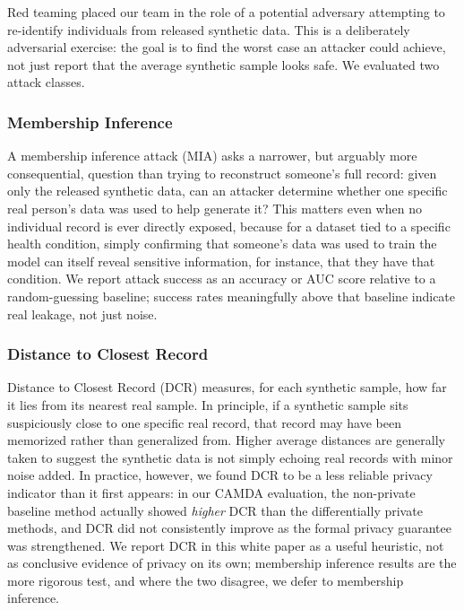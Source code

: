 \documentclass[webpdf,contemporary,large]{oup-authoring-template}%
\theoremstyle{thmstyleone}%
\theoremstyle{thmstyletwo}%
\theoremstyle{thmstylethree}%
\begin{document}
Red teaming placed our team in the role of a potential adversary attempting to re-identify individuals from released synthetic data. This is a deliberately adversarial exercise: the goal is to find the worst case an attacker could achieve, not just report that the average synthetic sample looks safe. We evaluated two attack classes.

\subsubsection{Membership Inference}

A membership inference attack (MIA) asks a narrower, but arguably more consequential, question than trying to reconstruct someone's full record: given only the released synthetic data, can an attacker determine whether one specific real person's data was used to help generate it? This matters even when no individual record is ever directly exposed, because for a dataset tied to a specific health condition, simply confirming that someone's data was used to train the model can itself reveal sensitive information, for instance, that they have that condition. We report attack success as an accuracy or AUC score relative to a random-guessing baseline; success rates meaningfully above that baseline indicate real leakage, not just noise.

\subsubsection{Distance to Closest Record}

Distance to Closest Record (DCR) measures, for each synthetic sample, how far it lies from its nearest real sample. In principle, if a synthetic sample sits suspiciously close to one specific real record, that record may have been memorized rather than generalized from. Higher average distances are generally taken to suggest the synthetic data is not simply echoing real records with minor noise added. In practice, however, we found DCR to be a less reliable privacy indicator than it first appears: in our CAMDA evaluation, the non-private baseline method actually showed \emph{higher} DCR than the differentially private methods, and DCR did not consistently improve as the formal privacy guarantee was strengthened. We report DCR in this white paper as a useful heuristic, not as conclusive evidence of privacy on its own; membership inference results are the more rigorous test, and where the two disagree, we defer to membership inference.
\end{document}
